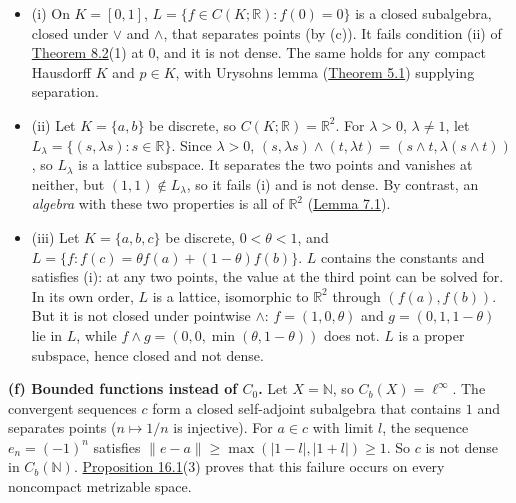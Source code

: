 \documentclass[
  english,
  11pt,
  a4paper,
]{article}
\providecommand{\tightlist}{%
  \setlength{\itemsep}{0pt}\setlength{\parskip}{0pt}}
\begin{document}
\begin{itemize}
\tightlist
\item
  (i) On \(K=[0,1]\), \(L=\{f\in C(K;\mathbb R):f(0)=0\}\) is a closed
  subalgebra, closed under \(\vee\) and \(\wedge\), that separates
  points (by (c)). It fails condition (ii) of
  \hyperlink{the-stone-weierstrass-theorem-for-functions-vanishing-at-infinity--oa-fnd-sw-06}{Theorem
  8.2}(1) at \(0\), and it is not dense. The same holds for any compact
  Hausdorff \(K\) and \(p\in K\), with Urysohn\textquotesingle s lemma
  (\hyperlink{the-stone-weierstrass-theorem-for-functions-vanishing-at-infinity--oa-fnd-sw-16}{Theorem
  5.1}) supplying separation.
\item
  (ii) Let \(K=\{a,b\}\) be discrete, so \(C(K;\mathbb R)=\mathbb R^2\).
  For \(\lambda>0\), \(\lambda\neq1\), let
  \(L_\lambda=\{(s,\lambda s):s\in\mathbb R\}\). Since \(\lambda>0\),
  \((s,\lambda s)\wedge(t,\lambda t)=(s\wedge t,\lambda(s\wedge t))\),
  so \(L_\lambda\) is a lattice subspace. It separates the two points
  and vanishes at neither, but \((1,1)\notin L_\lambda\), so it fails
  (i) and is not dense. By contrast, an \emph{algebra} with these two
  properties is all of \(\mathbb R^2\)
  (\hyperlink{the-stone-weierstrass-theorem-for-functions-vanishing-at-infinity--oa-fnd-sw-05}{Lemma
  7.1}).
\item
  (iii) Let \(K=\{a,b,c\}\) be discrete, \(0<\theta<1\), and
  \(L=\{f:f(c)=\theta f(a)+(1-\theta)f(b)\}\). \(L\) contains the
  constants and satisfies (i): at any two points, the value at the third
  point can be solved for. In its own order, \(L\) is a lattice,
  isomorphic to \(\mathbb R^2\) through \((f(a),f(b))\). But it is not
  closed under pointwise \(\wedge\): \(f=(1,0,\theta)\) and
  \(g=(0,1,1-\theta)\) lie in \(L\), while
  \(f\wedge g=(0,0,\min(\theta,1-\theta))\) does not. \(L\) is a proper
  subspace, hence closed and not dense.
\end{itemize}

\textbf{(f) Bounded functions instead of \(C_0\).} Let \(X=\mathbb N\),
so \(C_b(X)=\ell^\infty\). The convergent sequences \(c\) form a closed
self-adjoint subalgebra that contains \(1\) and separates points
(\(n\mapsto1/n\) is injective). For \(a\in c\) with limit \(l\), the
sequence \(e_n=(-1)^n\) satisfies \(\|e-a\|\geq\max(|1-l|,|1+l|)\geq1\).
So \(c\) is not dense in \(C_b(\mathbb N)\).
\hyperlink{the-stone-weierstrass-theorem-for-functions-vanishing-at-infinity--oa-fnd-sw-18}{Proposition
16.1}(3) proves that this failure occurs on every noncompact metrizable
space.
\end{document}
